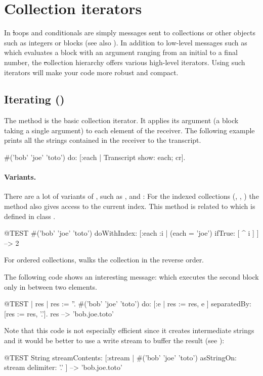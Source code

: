 \documentclass[a4paper,10pt,twoside]{book}
\begin{document}
\section{Collection iterators}

In \st loops and conditionals are simply messages sent to collections or other objects such as integers or blocks (see also ). In addition to low-level messages such as  which evaluates a block with an argument ranging from an initial to a final number, the \st collection hierarchy offers various high-level iterators. Using such iterators will make your code more robust and compact. 

\subsection{Iterating ()}
The method  is the basic collection iterator. It applies its argument (a block taking a single argument) to each element of the receiver.
The following example prints all the strings contained in the receiver to the transcript.

\begin{code}{}
#('bob' 'joe' 'toto') do: [:each | Transcript show: each; cr].
\end{code}

\paragraph{Variants.} There are a lot of variants of , such as \mbox{,} \mbox{} and :
For the indexed collections (, , ) the method  also gives access to the current index. This method is related to  which is defined in class .

\begin{code}{@TEST}
#('bob' 'joe' 'toto') doWithIndex: [:each :i | (each = 'joe') ifTrue: [ ^ i ] ] --> 2
\end{code}

For ordered collections,  walks the collection in the reverse order. 

The following code shows an interesting message:  which 
executes the second block only in between two elements.
\begin{code}{@TEST | res | }
res := ''.
#('bob' 'joe' 'toto') do: [:e | res := res, e ] separatedBy: [res := res, '.'].
res --> 'bob.joe.toto'
\end{code}
\noindent
Note that this code is not especially efficient since it creates intermediate strings and it would be better to use a write stream to buffer the result (see ):
\begin{code}{@TEST}
String streamContents: [:stream | #('bob' 'joe' 'toto') asStringOn: stream delimiter: '.' ] --> 'bob.joe.toto'
\end{code}
\end{document}
